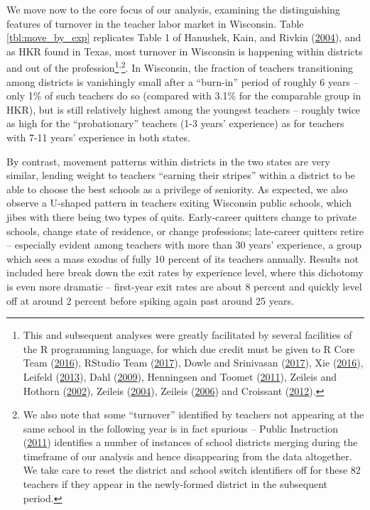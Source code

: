 \documentclass[12pt,]{article}
\let\rmarkdownfootnote\footnote%
\def\footnote{\protect\rmarkdownfootnote}
\begin{document}
We move now to the core focus of our analysis, examining the
distinguishing features of turnover in the teacher labor market in
Wisconsin. Table \ref{tbl:move_by_exp} replicates Table 1 of Hanushek,
Kain, and Rivkin (\protect\hyperlink{ref-hanushek}{2004}), and as HKR
found in Texas, most turnover in Wisconsin is happening within districts
and out of the profession\footnote{This and subsequent analyses were
  greatly facilitated by several facilities of the R programming
  language, for which due credit must be given to R Core Team
  (\protect\hyperlink{ref-r}{2016}), RStudio Team
  (\protect\hyperlink{ref-rstudio}{2017}), Dowle and Srinivasan
  (\protect\hyperlink{ref-dowle}{2017}), Xie
  (\protect\hyperlink{ref-xie}{2016}), Leifeld
  (\protect\hyperlink{ref-leifeld}{2013}), Dahl
  (\protect\hyperlink{ref-dahl}{2009}), Henningsen and Toomet
  (\protect\hyperlink{ref-henningsen}{2011}), Zeileis and Hothorn
  (\protect\hyperlink{ref-zeileis2002}{2002}), Zeileis
  (\protect\hyperlink{ref-zeileis2004}{2004}), Zeileis
  (\protect\hyperlink{ref-zeileis2006}{2006}) and Croissant
  (\protect\hyperlink{ref-croissant}{2012}).}\textsuperscript{,}\footnote{We
  also note that some ``turnover'' identified by teachers not appearing
  at the same school in the following year is in fact spurious -- Public
  Instruction (\protect\hyperlink{ref-dpi_name_change}{2011}) identifies
  a number of instances of school districts merging during the timeframe
  of our analysis and hence disappearing from the data altogether. We
  take care to reset the district and school switch identifiers off for
  these 82 teachers if they appear in the newly-formed district in the
  subsequent period.}. In Wisconsin, the fraction of teachers
transitioning among districts is vanishingly small after a ``burn-in''
period of roughly 6 years -- only 1\% of such teachers do so (compared
with 3.1\% for the comparable group in HKR), but is still relatively
highest among the youngest teachers -- roughly twice as high for the
``probationary'' teachers (1-3 years' experience) as for teachers with
7-11 years' experience in both states.

By contrast, movement patterns within districts in the two states are
very similar, lending weight to teachers ``earning their stripes''
within a district to be able to choose the best schools as a privilege
of seniority. As expected, we also observe a U-shaped pattern in
teachers exiting Wisconsin public schools, which jibes with there being
two types of quits. Early-career quitters change to private schools,
change state of residence, or change professions; late-career quitters
retire -- especially evident among teachers with more than 30 years'
experience, a group which sees a mass exodus of fully 10 percent of its
teachers annually. Results not included here break down the exit rates
by experience level, where this dichotomy is even more dramatic --
first-year exit rates are about 8 percent and quickly level off at
around 2 percent before spiking again past around 25 years.
\end{document}
